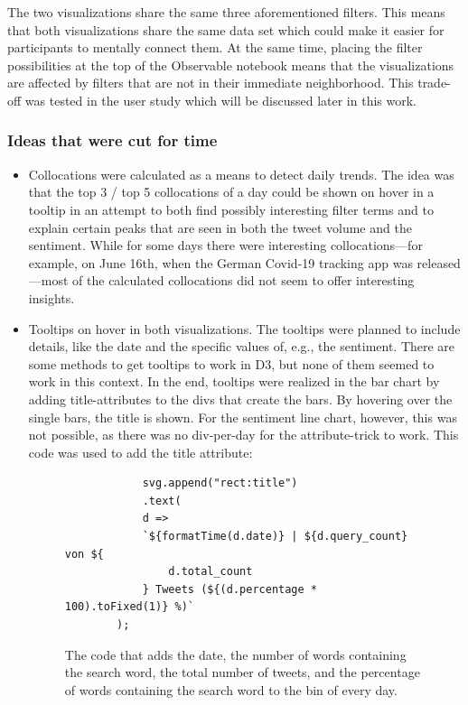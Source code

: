 The two visualizations share the same three aforementioned filters. This means that both visualizations share the same data set which could make it easier for participants to mentally connect them. At the same time, placing the filter possibilities at the top of the Observable notebook means that the visualizations are affected by filters that are not in their immediate neighborhood. This trade-off was tested in the user study which will be discussed later in this work.

\subsubsection{Ideas that were cut for time}
\begin{itemize}
    \item Collocations were calculated as a means to detect daily trends. The idea was that the top 3 / top 5 collocations of a day could be shown on hover in a tooltip in an attempt to both find possibly interesting filter terms and to explain certain peaks that are seen in both the tweet volume and the sentiment. While for some days there were interesting collocations---for example, on June 16th, when the German Covid-19 tracking app was released---most of the calculated collocations did not seem to offer interesting insights.
    \item Tooltips on hover in both visualizations. The tooltips were planned to include details, like the date and the specific values of, e.g., the sentiment. There are some methods to get tooltips to work in D3, but none of them seemed to work in this context. In the end, tooltips were realized in the bar chart by adding title-attributes to the divs that create the bars. By hovering over the single bars, the title is shown. For the sentiment line chart, however, this was not possible, as there was no div-per-day for the attribute-trick to work. This code was used to add the title attribute:
    \begin{figure}[h!]
        \begin{verbatim}
            svg.append("rect:title")
            .text(
            d =>
            `${formatTime(d.date)} | ${d.query_count} von ${
                d.total_count
            } Tweets (${(d.percentage * 100).toFixed(1)} %)`
        );
        \end{verbatim}
        \caption{The code that adds the date, the number of words containing the search word, the total number of tweets, and the percentage of words containing the search word to the bin of every day.}

\end{figure}
\end{itemize}
